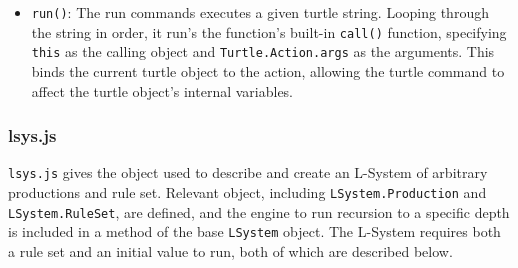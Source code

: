 \documentclass{article}
\newcommand{\tab}{\hspace*{2em}}
\begin{document}
\begin{itemize}
    \item \verb|run()|: The run commands executes a given turtle string. Looping through the string
in order, it run's the function's built-in \verb|call()| function, specifying \verb|this| as the
calling object and \verb|Turtle.Action.args| as the arguments. This binds the current turtle object
to the action, allowing the turtle command to affect the turtle object's internal variables.

\end{itemize}
            \subsubsection{lsys.js}
    \tab \verb|lsys.js| gives the object used to describe and create an L-System of arbitrary
productions and rule set. Relevant object, including \verb|LSystem.Production| and
\verb|LSystem.RuleSet|, are defined, and the engine to run recursion to a specific depth is
included in a method of the base \verb|LSystem| object. The L-System requires both a rule set and
an initial value to run, both of which are described below.
\end{document}
